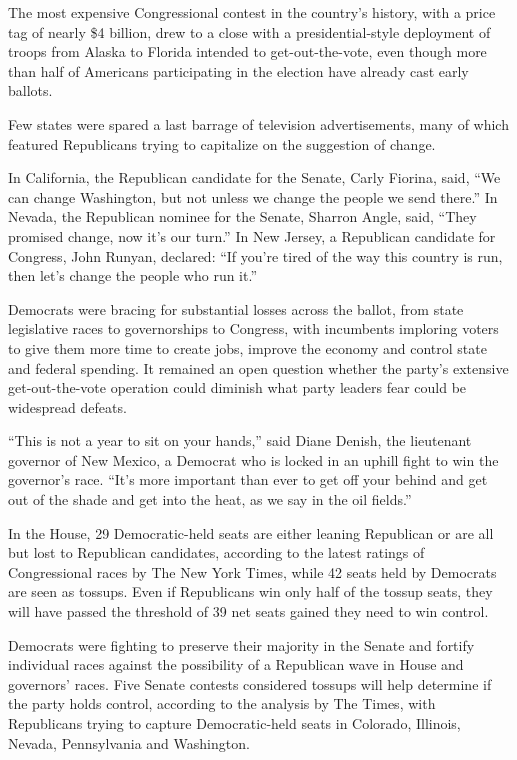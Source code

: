 ﻿\documentclass[12pt]{article}
\begin{document}
The most expensive Congressional contest in the country's history, with a price tag of nearly \$4
billion, drew to a close with a presidential-style deployment of troops from Alaska to Florida
intended to get-out-the-vote, even though more than half of Americans participating in the election
have already cast early ballots.

Few states were spared a last barrage of television advertisements, many of which featured
Republicans trying to capitalize on the suggestion of change.

In California, the Republican candidate for the Senate, Carly Fiorina, said, ``We can change
Washington, but not unless we change the people we send there.'' In Nevada, the Republican nominee
for the Senate, Sharron Angle, said, ``They promised change, now it's our turn.'' In New Jersey, a
Republican candidate for Congress, John Runyan, declared: ``If you're tired of the way this country
is run, then let's change the people who run it.''

Democrats were bracing for substantial losses across the ballot, from state legislative races to
governorships to Congress, with incumbents imploring voters to give them more time to create jobs,
improve the economy and control state and federal spending. It remained an open question whether the
party's extensive get-out-the-vote operation could diminish what party leaders fear could be
widespread defeats.

``This is not a year to sit on your hands,'' said Diane Denish, the lieutenant governor of New
Mexico, a Democrat who is locked in an uphill fight to win the governor's race. ``It's more
important than ever to get off your behind and get out of the shade and get into the heat, as we say
in the oil fields.''

In the House, 29 Democratic-held seats are either leaning Republican or are all but lost to
Republican candidates, according to the latest ratings of Congressional races by The New York Times,
while 42 seats held by Democrats are seen as tossups. Even if Republicans win only half of the
tossup seats, they will have passed the threshold of 39 net seats gained they need to win control.

Democrats were fighting to preserve their majority in the Senate and fortify individual races
against the possibility of a Republican wave in House and governors' races. Five Senate contests
considered tossups will help determine if the party holds control, according to the analysis by The
Times, with Republicans trying to capture Democratic-held seats in Colorado, Illinois, Nevada,
Pennsylvania and Washington.
\end{document}
